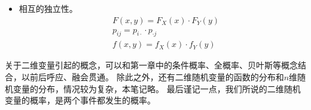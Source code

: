 \begin{itemize}
\begin{align*}
\begin{cases}
	    F_{X|Y}\left( x \middle| y_0 \right) =P\left\{ X\leqslant x \middle| Y=y_0 \right\}\\
	    F_{Y|X}\left( y \middle| x_0 \right) =P\left\{ Y\leqslant y \middle| X=x_0 \right\}\\
    \end{cases} \\
    &\begin{cases}
    	P\left\{ X=x_i \middle| Y=y_{j_0} \right\} =\frac{p_{ij_0}}{p_{\cdot j_0}}\\
    	P\left\{ Y=y_j \middle| X=x_{i_0} \right\} =\frac{p_{i_0j}}{p_{i_0\cdot}}\\
    \end{cases} \\
    &\begin{cases}
    	f_{X|Y}\left( x \middle| y_0 \right) =\frac{f\left( x,y_0 \right)}{f_Y\left( y_0 \right)}\\
    	f_{Y|X}\left( y \middle| x_0 \right) =\frac{f\left( x_0,y \right)}{f_X\left( x_0 \right)}\\
    \end{cases}
    \end{align*}
    \item 相互的独立性。
    \begin{align*}
    &F\left( x,y \right) =F_X\left( x \right) \cdot F_Y\left( y \right)  \\
    &p_{ij}=p_{i\cdot}\cdot p_{\cdot j} \\
    &f\left( x,y \right) =f_X\left( x \right) \cdot f_Y\left( y \right)
    \end{align*}
\end{itemize}

关于二维变量引起的概念，可以和第一章中的条件概率、全概率、贝叶斯等概念结合，以前后呼应、融会贯通。
除此之外，还有二维随机变量的函数的分布和$n$维随机变量的分布，情况较为复杂，本笔记略。
最后谨记一点，我们所说的二维随机变量的概率，是两个事件都发生的概率。




